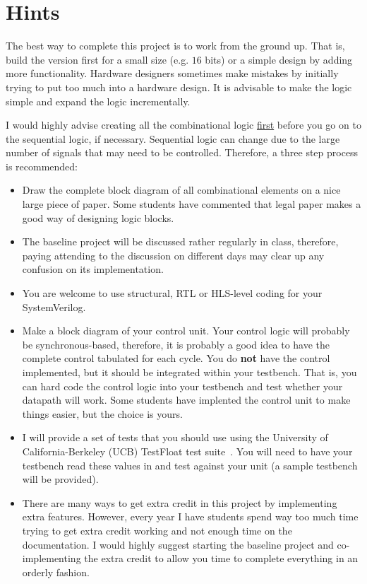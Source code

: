 \documentclass[times, 10pt, twocolumn]{IEEEtran}
\begin{document}
\section{Hints}

The best way to complete this project is to work from the ground up.  That
is, build the version first for a small size (e.g. $16$ bits) or a
simple design by adding more functionality.
Hardware designers sometimes make mistakes
by initially trying to put too much into a hardware design.  It is advisable
to make the logic simple and expand the logic incrementally.

I would highly advise creating all the combinational logic
\underline{first} before you go on to the sequential logic, if
necessary.  Sequential
logic can change due to the large number of signals that may need to be
controlled.  Therefore, a three step process is recommended:
\begin{itemize}
\item Draw the complete block diagram of all combinational elements on a nice
  large piece of paper.  Some students have commented that legal paper makes
  a good way of designing logic blocks.
\item  The baseline project will be discussed rather
  regularly in class, therefore, paying attending to the discussion on
  different days may clear up any confusion on its implementation.
\item You are welcome to use structural, RTL or HLS-level coding
  for your SystemVerilog.  
\item Make a block diagram of your control unit.  Your control logic will
  probably be synchronous-based, therefore, it is probably a good idea
  to have the complete control tabulated for each cycle. You do
  \textbf{not} have the
  control implemented, but it should be integrated within your
  testbench.  That is, you
  can hard code the control logic into your testbench and test whether your
  datapath will work.  Some students have implented the control unit
  to make things easier, but the choice is yours. 
\item I will provide a set of tests that you should use using the
  University of California-Berkeley (UCB) TestFloat test suite~\cite{hauser}.  You  
  will need to have your testbench read these values in and test
  against  your unit (a sample testbench will be provided).
\item There are many ways to get extra credit in this project by implementing
  extra features.  However, every year I have students spend way too much
  time trying to get extra credit working and not enough time on the
  documentation.  I would highly suggest starting the
  baseline project and
  co-implementing the extra credit to allow you time to complete everything
  in an orderly fashion.  
\end{itemize}



\end{document}
